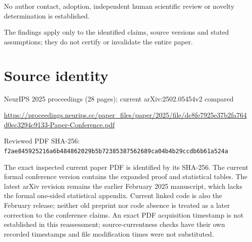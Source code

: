\documentclass[11pt]{article}
\begin{document}
No author contact, adoption, independent human scientific review or novelty determination is established.\par

The findings apply only to the identified claims, source versions and stated assumptions; they do not certify or invalidate the entire paper.\par

\section*{Source identity}

NeurIPS 2025 proceedings (28 pages); current arXiv:2502.05454v2 compared

\url{https://proceedings.neurips.cc/paper_files/paper/2025/file/dc8fe7925e37b2fa764d0ec3294c9133-Paper-Conference.pdf}

Reviewed PDF SHA-256: \nolinkurl{f2ae845925216a6b484862029b5b72385387562689ca04b4b29ccdb6b61a524a}

The exact inspected current paper PDF is identified by its SHA-256. The current formal conference version contains the expanded proof and statistical tables. The latest arXiv revision remains the earlier February 2025 manuscript, which lacks the formal one-sided statistical appendix. Current linked code is also the February release; neither old preprint nor code absence is treated as a later correction to the conference claims. An exact PDF acquisition timestamp is not established in this reassessment; source-currentness checks have their own recorded timestamps and file modification times were not substituted.
\end{document}
